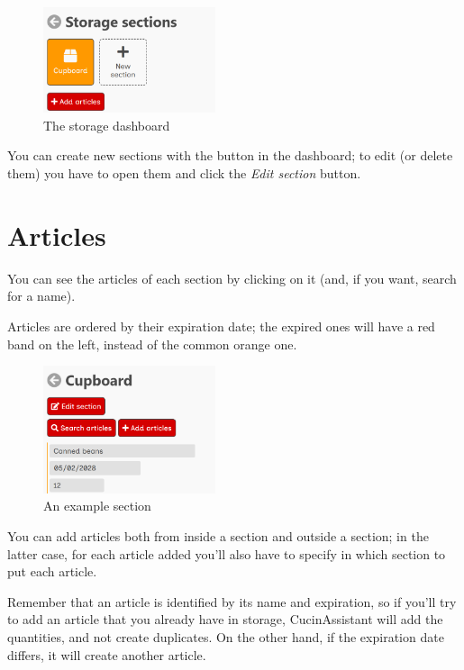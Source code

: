 \documentclass[12pt, a4paper]{report}
\begin{document}
    \begin{figure}[H]
        \centering
        \includegraphics[width=0.45\textwidth]{assets/en/sections.png}
        \caption{The storage dashboard}
    \end{figure}

    You can create new sections with the button in the dashboard; to edit (or delete them) you have to open them and click the \emph{Edit section}
    button.

    \section{Articles}

    You can see the articles of each section by clicking on it (and, if you want, search for a name).

    Articles are ordered by their expiration date; the expired ones will have a red band on the left, instead of the common orange one.

    \begin{figure}[H]
        \centering
        \includegraphics[width=0.45\textwidth]{assets/en/articles.png}
        \caption{An example section}
    \end{figure}

    You can add articles both from inside a section and outside a section; in the latter case, for each article added you'll also have to specify in
    which section to put each article.

    Remember that an article is identified by its name and expiration, so if you'll try to add an article that you already have in storage,
    CucinAssistant will add the quantities, and not create duplicates. On the other hand, if the expiration date differs, it will create another
    article.
\end{document}
